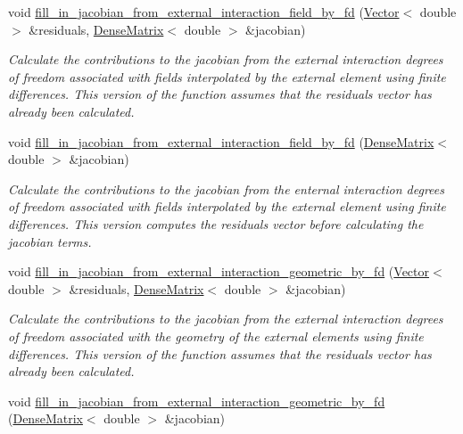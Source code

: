 \begin{DoxyCompactItemize}
void \hyperlink{classoomph_1_1ElementWithExternalElement_a62e562dd53ec309e124c2e1962cee9e7}{fill\+\_\+in\+\_\+jacobian\+\_\+from\+\_\+external\+\_\+interaction\+\_\+field\+\_\+by\+\_\+fd} (\hyperlink{classoomph_1_1Vector}{Vector}$<$ double $>$ \&residuals, \hyperlink{classoomph_1_1DenseMatrix}{Dense\+Matrix}$<$ double $>$ \&jacobian)
\begin{DoxyCompactList}\small\item\em Calculate the contributions to the jacobian from the external interaction degrees of freedom associated with fields interpolated by the external element using finite differences. This version of the function assumes that the residuals vector has already been calculated. \end{DoxyCompactList}\item 
void \hyperlink{classoomph_1_1ElementWithExternalElement_a4a1a2b23e08881c57488b27da45d4ef0}{fill\+\_\+in\+\_\+jacobian\+\_\+from\+\_\+external\+\_\+interaction\+\_\+field\+\_\+by\+\_\+fd} (\hyperlink{classoomph_1_1DenseMatrix}{Dense\+Matrix}$<$ double $>$ \&jacobian)
\begin{DoxyCompactList}\small\item\em Calculate the contributions to the jacobian from the enternal interaction degrees of freedom associated with fields interpolated by the external element using finite differences. This version computes the residuals vector before calculating the jacobian terms. \end{DoxyCompactList}\item 
void \hyperlink{classoomph_1_1ElementWithExternalElement_ac0bd87a3f4ec8e87acb0fb450fa7e892}{fill\+\_\+in\+\_\+jacobian\+\_\+from\+\_\+external\+\_\+interaction\+\_\+geometric\+\_\+by\+\_\+fd} (\hyperlink{classoomph_1_1Vector}{Vector}$<$ double $>$ \&residuals, \hyperlink{classoomph_1_1DenseMatrix}{Dense\+Matrix}$<$ double $>$ \&jacobian)
\begin{DoxyCompactList}\small\item\em Calculate the contributions to the jacobian from the external interaction degrees of freedom associated with the geometry of the external elements using finite differences. This version of the function assumes that the residuals vector has already been calculated. \end{DoxyCompactList}\item 
void \hyperlink{classoomph_1_1ElementWithExternalElement_adbdc1df03ef1c5f24d51c5ad6061c672}{fill\+\_\+in\+\_\+jacobian\+\_\+from\+\_\+external\+\_\+interaction\+\_\+geometric\+\_\+by\+\_\+fd} (\hyperlink{classoomph_1_1DenseMatrix}{Dense\+Matrix}$<$ double $>$ \&jacobian)

\end{DoxyCompactItemize}

